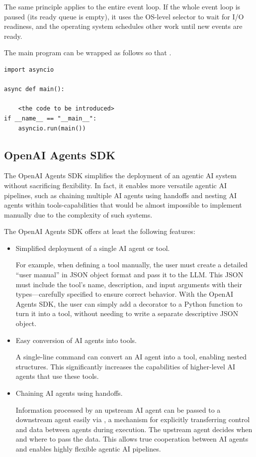 The same principle applies to the entire event loop. If the whole event loop is paused (its ready queue is empty), it uses the OS-level selector to wait for I/O readiness, and the operating system schedules other work until new events are ready.

The main program can be wrapped as follows so that .
\begin{lstlisting}
import asyncio

async def main():

	<the code to be introduced>
if __name__ == "__main__":
	asyncio.run(main())
\end{lstlisting}

\subsection{OpenAI Agents SDK} \label{sec:openaisgentssdk}

The OpenAI Agents SDK simplifies the deployment of an agentic AI system without sacrificing flexibility. In fact, it enables more versatile agentic AI pipelines, such as chaining multiple AI agents using handoffs and nesting AI agents within tools-capabilities that would be almost impossible to implement manually due to the complexity of such systems.

The OpenAI Agents SDK offers at least the following features:
\begin{itemize}
	\item Simplified deployment of a single AI agent or tool.
	
	For example, when defining a tool manually, the user must create a detailed “user manual” in JSON object format and pass it to the LLM. This JSON must include the tool’s name, description, and input arguments with their types—carefully specified to ensure correct behavior. With the OpenAI Agents SDK, the user can simply add a decorator to a Python function to turn it into a tool, without needing to write a separate descriptive JSON object.
	
	\item Easy conversion of AI agents into tools.
	
	A single-line command can convert an AI agent into a tool, enabling nested structures. This significantly increases the capabilities of higher-level AI agents that use these tools.
	
	\item Chaining AI agents using handoffs. 
	
	Information processed by an upstream AI agent can be passed to a downstream agent easily via , a mechanism for explicitly transferring control and data between agents during execution. The upstream agent decides when and where to pass the data. This allows true cooperation between AI agents and enables highly flexible agentic AI pipelines.
\end{itemize}

